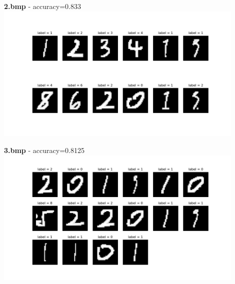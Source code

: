 \documentclass[12pt,a4paper]{article}
\begin{document}
\begin{enumerate}
		\textbf{2.bmp} - accuracy=0.833 \\
		\includegraphics[width=0.9\textwidth]{./result_images/digits_of_image_2/2_label.png}

		\pagebreak
		\textbf{3.bmp} - accuracy=0.8125 \\
		\includegraphics[width=0.9\textwidth]{./result_images/digits_of_image_3/3_label.png}



	\end{enumerate}
		
\end{document}
